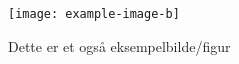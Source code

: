 \begin{figure}[h]
    \centering
    \texttt{[image: example-image-b]}
    \caption{Dette er et også eksempelbilde/figur}
    \label{fig:yesd}
\end{figure}
